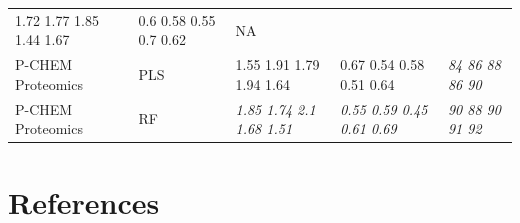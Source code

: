 \documentclass[utf8]{frontiersHLTH} %
\begin{document}
\begin{longtable}[]{@{}lllll@{}}
\begin{minipage}[t]{0.19\columnwidth}
1.72 1.77 1.85 1.44 1.67\strut
\end{minipage} & \begin{minipage}[t]{0.19\columnwidth}\raggedright\strut
0.6 0.58 0.55 0.7 0.62\strut
\end{minipage} & \begin{minipage}[t]{0.27\columnwidth}\raggedright\strut
NA\strut
\end{minipage}\tabularnewline
\begin{minipage}[t]{0.13\columnwidth}\raggedright\strut
P-CHEM Proteomics\strut
\end{minipage} & \begin{minipage}[t]{0.08\columnwidth}\raggedright\strut
PLS\strut
\end{minipage} & \begin{minipage}[t]{0.19\columnwidth}\raggedright\strut
1.55 1.91 1.79 1.94 1.64\strut
\end{minipage} & \begin{minipage}[t]{0.19\columnwidth}\raggedright\strut
0.67 0.54 0.58 0.51 0.64\strut
\end{minipage} & \begin{minipage}[t]{0.27\columnwidth}\raggedright\strut
\emph{84 86 88 86 90}\strut
\end{minipage}\tabularnewline
\begin{minipage}[t]{0.13\columnwidth}\raggedright\strut
P-CHEM Proteomics\strut
\end{minipage} & \begin{minipage}[t]{0.08\columnwidth}\raggedright\strut
RF\strut
\end{minipage} & \begin{minipage}[t]{0.19\columnwidth}\raggedright\strut
\emph{1.85 1.74 2.1 1.68 1.51}\strut
\end{minipage} & \begin{minipage}[t]{0.19\columnwidth}\raggedright\strut
\emph{0.55 0.59 0.45 0.61 0.69}\strut
\end{minipage} & \begin{minipage}[t]{0.27\columnwidth}\raggedright\strut
\emph{90 88 90 91 92}\strut
\end{minipage}\tabularnewline
\bottomrule
\end{longtable}

\section*{References}\label{references}
\end{document}
